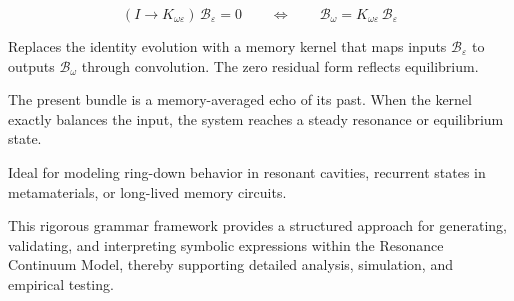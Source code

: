\begin{styledexample}
  \item[\emph{Expression}] 
  \[
    (I \to K_{\omega\varepsilon})\,\mathcal{B}_\varepsilon = 0
    \qquad \Longleftrightarrow \qquad
    \mathcal{B}_\omega = K_{\omega\varepsilon}\,\mathcal{B}_\varepsilon
  \]

  \item[\emph{What it does}]
  Replaces the identity evolution with a memory kernel that maps inputs \(\mathcal{B}_\varepsilon\) to outputs \(\mathcal{B}_\omega\) through convolution. The zero residual form reflects equilibrium.

  \item[\emph{Intuition}]
  The present bundle is a memory-averaged echo of its past. When the kernel exactly balances the input, the system reaches a steady resonance or equilibrium state.

  \item[\emph{Use case}]
  Ideal for modeling ring-down behavior in resonant cavities, recurrent states in metamaterials, or long-lived memory circuits.
\end{styledexample}



This rigorous grammar framework provides a structured approach for generating, validating, and interpreting symbolic expressions within the Resonance Continuum Model, thereby supporting detailed analysis, simulation, and empirical testing.

